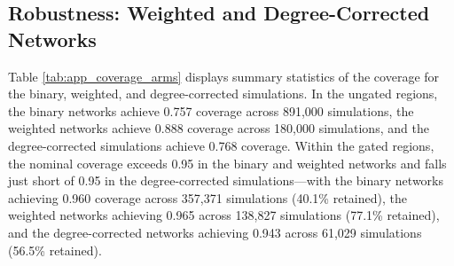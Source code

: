 \documentclass[11pt, letterpaper]{article}
\numberwithin{equation}{section}
\begin{document}
\begin{table}[ht]
\centering\scriptsize
\caption{Calibrated accuracy floor by stability bin at each level (partition NMI, partition ARI, node-level Jaccard): calibration fits, median accuracy, 5th-percentile floor and validation share above the floor.}
\label{tab:app_stability_levels}
\label{tab:coverage_gate}

\end{table}

\begin{table}[ht]
\centering\small
\caption{Node-pair decisions on the validation half: share of sampled pairs decided together (co-membership share $\geq 0.9$), decided apart ($\leq 0.1$) and undetermined, with agreement to the true partition.}
\label{tab:app_stability_pairs}

\end{table}

\subsection{Robustness: Weighted and Degree-Corrected Networks}
Table \ref{tab:app_coverage_arms} displays summary statistics of the coverage for the binary, weighted, and degree-corrected simulations. In the ungated regions, the binary networks achieve 0.757 coverage across 891,000 simulations, the weighted networks achieve 0.888 coverage across 180,000 simulations, and the degree-corrected simulations achieve 0.768 coverage. Within the gated regions, the nominal coverage exceeds 0.95 in the binary and weighted networks and falls just short of 0.95 in the degree-corrected simulations---with the binary networks achieving 0.960 coverage across 357,371 simulations (40.1\% retained), the weighted networks achieving 0.965 across 138,827 simulations (77.1\% retained), and the degree-corrected networks achieving 0.943 across 61,029 simulations (56.5\% retained). 



\begin{table}[ht]
\centering\small
\caption{Validation of the binary-calibrated floor across simulation arms: number of fits, number whose stability bin has a calibrated floor, share of those above the floor, Spearman correlation of stability and accuracy, mean stability and mean accuracy.}
\label{tab:app_stability_arms}
\label{tab:app_coverage_arms}

\end{table}
\end{document}
